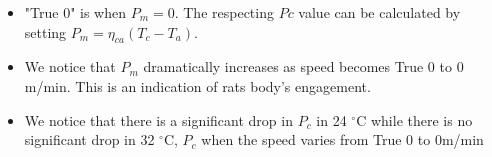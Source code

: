 \documentclass[landscape,paperwidth=42in,paperheight=52in,fontscale=0.27]{baposter} %
\newcommand{\compresslist}{ %
\setlength{\itemsep}{1pt}
\setlength{\parskip}{0pt}
\setlength{\parsep}{0pt}
}
\begin{document}
\begin{poster}
{\begin{itemize}\compresslist
\item "True 0" is when $P_{m}=0$. The respecting $Pc$ value can be calculated by setting $P_{m} = \eta_{ca} (T_c - T_a)$. 
\item We notice that $P_{m}$ dramatically increases as speed becomes True 0 to 0 m/min. This is an indication of rats body's engagement.
\item We notice that there is a significant drop in $P_{c}$ in 24 $^{\circ}$C while there is no significant drop in 32 $^{\circ}$C, $P_{c}$ when the speed varies from True 0 to 0m/min 
\end{itemize}







}



\end{poster}
\end{document}
